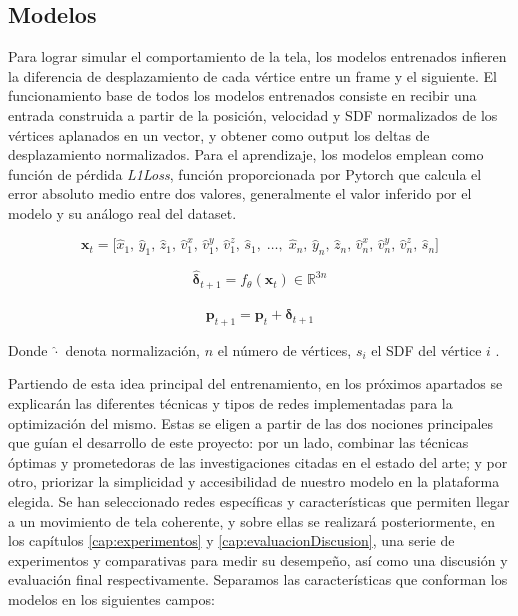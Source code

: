 \subsection{Modelos}
Para lograr simular el comportamiento de la tela, los modelos entrenados infieren la diferencia de desplazamiento de cada vértice entre un frame y el siguiente. El funcionamiento base de todos los modelos entrenados consiste en recibir una entrada construida a partir de la posición, velocidad y SDF normalizados de los vértices aplanados en un vector, y obtener como output los deltas de desplazamiento normalizados. Para el aprendizaje, los modelos emplean como función de pérdida \textit{L1Loss}, función proporcionada por Pytorch que calcula el error absoluto medio entre dos valores, generalmente el valor inferido por el modelo y su análogo real del dataset. \newline

\begin{equation}
    \mathbf{x}_{t} = \bigl[
        \hat{x}_1,\, \hat{y}_1,\, \hat{z}_1,\,
        \hat{v}^x_1,\, \hat{v}^y_1,\, \hat{v}^z_1,\,
        \hat{s}_1,\;
        \ldots,\;
        \hat{x}_n,\, \hat{y}_n,\, \hat{z}_n,\,
        \hat{v}^x_n,\, \hat{v}^y_n,\, \hat{v}^z_n,\,
        \hat{s}_n
    \bigr]
\end{equation}

\begin{equation}
    \hat{\boldsymbol{\delta}}_{t+1} = f_\theta(\mathbf{x}_{t}) \in \mathbb{R}^{3n}
\end{equation}

\begin{equation}
    \mathbf{p}_{t+1} = \mathbf{p}_{t} + \hat{\boldsymbol{\delta}}_{t+1}
\end{equation}

Donde $\hat{\cdot}$ denota normalización, $n$ el número de vértices, $s_i$ el SDF del vértice $i$ . \newline

Partiendo de esta idea principal del entrenamiento, en los próximos apartados se explicarán las diferentes técnicas y tipos de redes implementadas para la optimización del mismo. Estas se eligen a partir de las dos nociones principales que guían el desarrollo de este proyecto: por un lado, combinar las técnicas óptimas y prometedoras de las investigaciones citadas en el estado del arte; y por otro, priorizar la simplicidad y accesibilidad de nuestro modelo en la plataforma elegida. Se han seleccionado redes específicas y características que permiten llegar a un movimiento de tela coherente, y sobre ellas se realizará posteriormente, en los capítulos \ref{cap:experimentos} y \ref{cap:evaluacionDiscusion}, una serie de experimentos y comparativas para medir su desempeño, así como una discusión y evaluación final respectivamente. Separamos las características que conforman los modelos en los siguientes campos:


